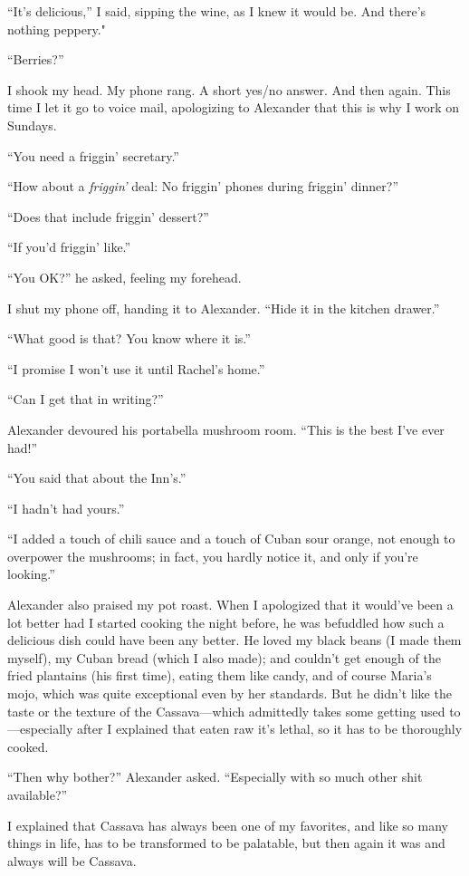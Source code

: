 ``It's delicious,'' I said, sipping the wine, as I knew it would be. And
there's nothing peppery."

``Berries?''

I shook my head. My phone rang. A short yes/no answer. And then again.
This time I let it go to voice mail, apologizing to Alexander that this
is why I work on Sundays.

``You need a friggin' secretary.''

``How about a \emph{friggin'} deal: No friggin' phones during friggin'
dinner?''

``Does that include friggin' dessert?''

``If you'd friggin' like.''

``You OK?'' he asked, feeling my forehead.

I shut my phone off, handing it to Alexander. ``Hide it in the kitchen
drawer.''

``What good is that? You know where it is.''

``I promise I won't use it until Rachel's home.''

``Can I get that in writing?''

Alexander devoured his portabella mushroom room. ``This is the best I've
ever had!''

``You said that about the Inn's.''

``I hadn't had yours.''

``I added a touch of chili sauce and a touch of Cuban sour orange, not
enough to overpower the mushrooms; in fact, you hardly notice it, and
only if you're looking.''

Alexander also praised my pot roast. When I apologized that it would've
been a lot better had I started cooking the night before, he was
befuddled how such a delicious dish could have been any better. He loved
my black beans (I made them myself), my Cuban bread (which I also made);
and couldn't get enough of the fried plantains (his first time), eating
them like candy, and of course Maria's mojo, which was quite exceptional
even by her standards. But he didn't like the taste or the texture of
the Cassava---which admittedly takes some getting used to---especially
after I explained that eaten raw it's lethal, so it has to be thoroughly
cooked.

``Then why bother?'' Alexander asked. ``Especially with so much other
shit available?''

I explained that Cassava has always been one of my favorites, and like
so many things in life, has to be transformed to be palatable, but then
again it was and always will be Cassava.

